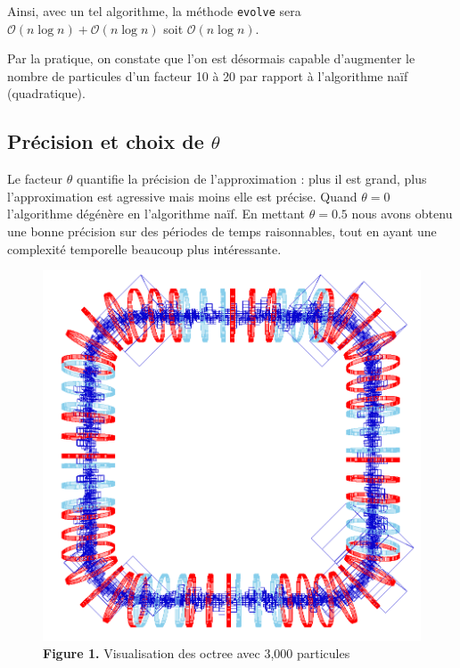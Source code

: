 \documentclass[12pt, letterpaper, twoside]{article}
\newcommand{\T}[1]{\texttt{#1}}
\def\O{\mathcal{O}}
\begin{document}
Ainsi, avec un tel algorithme, la méthode \T{evolve} sera $\O(n \log n) + \O(n \log n)$ soit $\O(n \log n)$.

Par la pratique, on constate que l'on est désormais capable d'augmenter le nombre de particules d'un facteur 10 à 20 par rapport à l'algorithme naïf (quadratique).

\subsection*{Précision et choix de $\theta$}
Le facteur $\theta$ quantifie la précision de l'approximation : plus il est grand, plus l'approximation est agressive mais moins elle est précise. Quand $\theta = 0$ l'algorithme dégénère en l'algorithme naïf. En mettant $\theta = 0.5$ nous avons obtenu une bonne précision sur des périodes de temps raisonnables, tout en ayant une complexité temporelle beaucoup plus intéressante.

\begin{figure}
	\centering
	\includegraphics[width=5in]{images/octree.png}
	\caption{\textbf{Figure 1.} Visualisation des octree avec 3,000 particules}
\end{figure}
\end{document}
